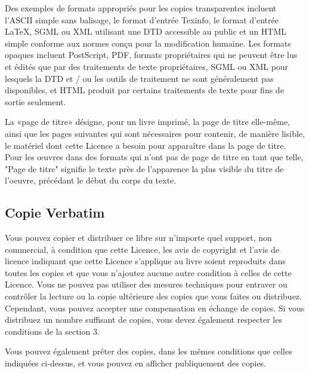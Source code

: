 	Des exemples de formats appropri\'es pour les copies transparentes incluent l'ASCII simple sans balisage, le format d'entr\'ee Texinfo, le format d'entr\'ee LaTeX, SGML ou XML utilisant une DTD accessible au public et un HTML simple conforme aux normes conçu pour la modification humaine. Les formats opaques incluent PostScript, PDF, formats propri\'etaires qui ne peuvent être lus et \'edit\'es que par des traitements de texte propri\'etaires, SGML ou XML pour lesquels la DTD et / ou les outils de traitement ne sont g\'en\'eralement pas disponibles, et HTML produit par certains traitements de texte pour fins de sortie seulement.

	La «page de titre» d\'esigne, pour un livre imprim\'e, la page de titre elle-même, ainsi que les pages suivantes qui sont n\'ecessaires pour contenir, de manière lisible, le mat\'eriel dont cette Licence a besoin pour apparaître dans la page de titre. Pour les œuvres dans des formats qui n'ont pas de page de titre en tant que telle, "Page de titre" signifie le texte près de l'apparence la plus visible du titre de l'oeuvre, pr\'ec\'edant le d\'ebut du corps du texte.

	\subsection{Copie Verbatim} 
	Vous pouvez copier et distribuer ce libre sur n'importe quel support, non commercial, à condition que cette Licence, les avis de copyright et l'avis de licence indiquant que cette Licence s'applique au livre soient reproduits dans toutes les copies et que vous n'ajoutez aucune autre condition à celles de cette Licence. Vous ne pouvez pas utiliser des mesures techniques pour entraver ou contrôler la lecture ou la copie ult\'erieure des copies que vous faites ou distribuez. Cependant, vous pouvez accepter une compensation en \'echange de copies. Si vous distribuez un nombre suffisant de copies, vous devez \'egalement respecter les conditions de la section 3.

	Vous pouvez \'egalement prêter des copies, dans les mêmes conditions que celles indiqu\'ees ci-dessus, et vous pouvez en afficher publiquement des copies. 

